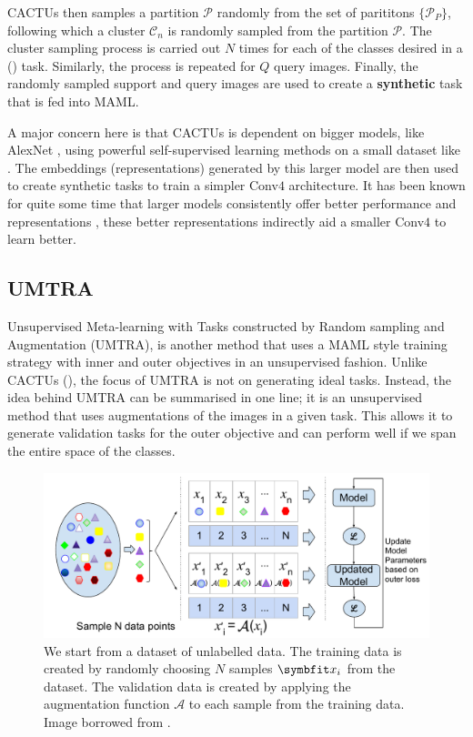 CACTUs then samples a partition $\mathcal{P}$ randomly from the set of parititons $\{\mathcal{P}_P\}$, following which a cluster $\mathcal{C}_n$ is randomly sampled from the partition $\mathcal{P}$. The cluster sampling process is carried out $N$ times for each of the classes desired in a () task. Similarly, the process is repeated for $Q$ query images. Finally, the randomly sampled support and query images are used to create a \textbf{synthetic} task that is fed into MAML.

A major concern here is that CACTUs is dependent on bigger models, like AlexNet \parencite{AlexNet2012}, using powerful self-supervised learning methods on a small dataset like \miniImagenet{}. The embeddings (representations) generated by this larger model are then used to create synthetic tasks to train a simpler Conv$4$ architecture. It has been known for quite some time that larger models consistently offer better performance and representations \parencite{Dosovitskiy2020, He2015}, these better representations indirectly aid a smaller Conv$4$ to learn better.

\subsection{UMTRA} \label{ssec:umtra}

Unsupervised Meta-learning with Tasks constructed by Random sampling and Augmentation (UMTRA), is another method that uses a MAML style training strategy with inner and outer objectives in an unsupervised fashion.
Unlike CACTUs (), the focus of UMTRA is not on generating ideal tasks. 
Instead, the idea behind UMTRA can be summarised in one line; it is an unsupervised method that uses augmentations of the images in a given task. This allows it to generate  validation tasks for the outer objective and can perform well if we span the entire space of the classes.

\begin{figure}[ht]
    \centering
    \includegraphics[width=\linewidth]{chapters/assets/fsl/UnsupervisedMetaTraining3.pdf}
    \caption{We start from a dataset of unlabelled data. The training data is created by randomly choosing $N$ samples $\bfitx_i$ from the dataset. The validation data is created by applying the augmentation function $\mathcal{A}$ to each sample from the training data. Image borrowed from \parencite{Khodadadeh2018UnsupervisedClassification}.}
    \label{fig:umtra}
\end{figure}

